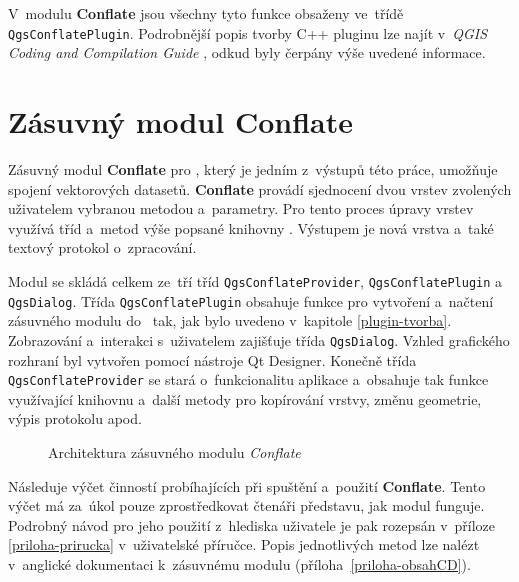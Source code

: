 V~modulu \textbf{Conflate} jsou všechny tyto funkce obsaženy ve~třídě
\texttt{Qgs\-Con\-flate\-Plugin}. 
Podrobnější popis tvorby C++ pluginu lze najít v~\textit{QGIS Coding and 
Compilation Guide} \cite{qgisCCguide}, odkud byly čerpány výše uvedené 
informace.



\section{Zásuvný modul Conflate}
\label{plugin-navrh}

Zásuvný modul \textbf{Conflate} pro , který je jedním z~výstupů této
práce, umožňuje spojení vektorových datasetů. \textbf{Conflate} provádí 
sjednocení dvou vrstev zvolených uživatelem vybranou metodou a~parametry. Pro 
tento proces úpravy vrstev využívá tříd a~metod výše popsané knihovny . 
Výstupem je nová vrstva a~také textový protokol o~zpracování.

Modul se skládá celkem ze~tří tříd \texttt{QgsConflateProvider}, 
\texttt{QgsConflatePlugin} a~ \texttt{QgsDialog}. Třída \texttt{QgsConflatePlugin} 
obsahuje funkce pro vytvoření a~načtení zásuvného modulu do~ tak, jak 
bylo uvedeno v~kapitole \ref{plugin-tvorba}. Zobrazování a~interakci s~uživatelem 
zajišťuje třída \texttt{QgsDialog}. Vzhled grafického rozhraní byl vytvořen 
pomocí nástroje Qt Designer. Konečně třída \texttt{QgsConflateProvider} 
se stará o~funkcionalitu aplikace a~obsahuje tak funkce využívající knihovnu 
 a~další metody pro kopírování vrstvy, změnu geometrie, výpis 
protokolu apod.

\vspace{0.5cm}
\label{schema}
  \begin{figure}[h]
    \centering
      
      \caption{Architektura zásuvného modulu \textit{Conflate}}
      \label{fig:schema}
  \end{figure} 

Následuje výčet činností probíhajících při spuštění a~použití \textbf{Conflate}.
Tento výčet má za~úkol pouze zprostředkovat čtenáři představu, jak modul funguje.
Podrobný návod pro jeho použití z~hlediska uživatele je pak rozepsán v~příloze
\ref{priloha-prirucka} v~uživatelské příručce. Popis jednotlivých metod
lze nalézt v~anglické dokumentaci k~zásuvnému modulu (příloha~\ref{priloha-obsahCD}).

